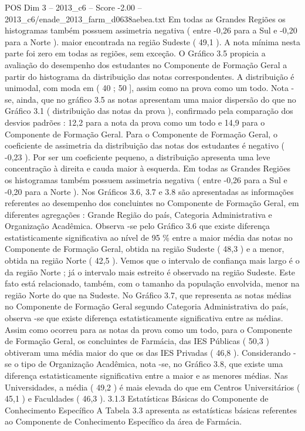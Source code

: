 \begin{textsample}{POS Dim 3 – 2013\_c6 – Score -2.00 – 2013\_c6/enade\_2013\_farm\_d0638aebea.txt}
Em todas as Grandes Regiões os histogramas também possuem assimetria negativa ( entre -0,26 para a Sul e -0,20 para a Norte ). maior encontrada na região Sudeste ( 49,1 ).
A nota mínima nesta parte foi zero em todas as regiões, sem exceção.
O Gráfico 3.5 propicia a avaliação do desempenho dos estudantes no Componente de Formação Geral a partir do histograma da distribuição das notas correspondentes.
A distribuição é unimodal, com moda em ( 40 ; 50 ], assim como na prova como um todo.
Nota -se, ainda, que no gráfico 3.5 as notas apresentam uma maior dispersão do que no Gráfico 3.1 ( distribuição das notas da prova ), confirmado pela comparação dos desvios padrões : 12,2 para a nota da prova como um todo e 14,9 para o Componente de Formação Geral.
Para o Componente de Formação Geral, o coeficiente de assimetria da distribuição das notas dos estudantes é negativo ( -0,23 ).
Por ser um coeficiente pequeno, a distribuição apresenta uma leve concentração à direita e cauda maior à esquerda.
Em todas as Grandes Regiões os histogramas também possuem assimetria negativa ( entre -0,26 para a Sul e -0,20 para a Norte ).
Nos Gráficos 3.6, 3.7 e 3.8 são apresentadas as informações referentes ao desempenho dos concluintes no Componente de Formação Geral, em diferentes agregações : Grande Região do país, Categoria Administrativa e Organização Acadêmica.
Observa -se pelo Gráfico 3.6 que existe diferença estatisticamente significativa ao nível de 95 \% entre a maior média das notas no Componente de Formação Geral, obtida na região Sudeste ( 48,3 ) e a menor, obtida na região Norte ( 42,5 ).
Vemos que o intervalo de confiança mais largo é o da região Norte ; já o intervalo mais estreito é observado na região Sudeste.
Este fato está relacionado, também, com o tamanho da população envolvida, menor na região Norte do que na Sudeste.
No Gráfico 3.7, que representa as notas médias no Componente de Formação Geral segundo Categoria Administrativa do país, observa -se que existe diferença estatisticamente significativa entre as médias.
Assim como ocorreu para as notas da prova como um todo, para o Componente de Formação Geral, os concluintes de Farmácia, das IES Públicas ( 50,3 ) obtiveram uma média maior do que os das IES Privadas ( 46,8 ).
Considerando -se o tipo de Organização Acadêmica, nota -se, no Gráfico 3.8, que existe uma diferença estatisticamente significativa entre a maior e as menores médias.
Nas Universidades, a média ( 49,2 ) é mais elevada do que em Centros Universitários ( 45,1 ) e Faculdades ( 46,3 ). 3.1.3 Estatísticas Básicas do Componente de Conhecimento Específico A Tabela 3.3 apresenta as estatísticas básicas referentes ao Componente de Conhecimento Específico da área de Farmácia.

\end{textsample}
